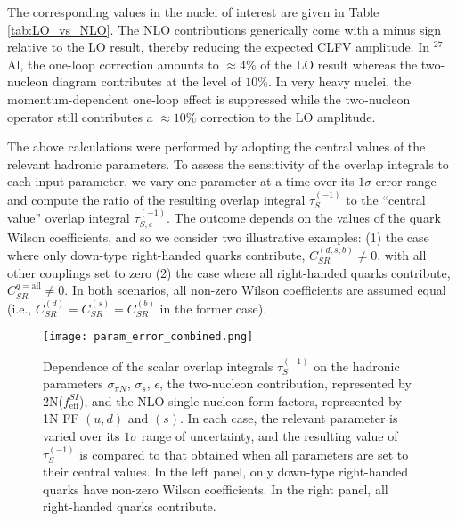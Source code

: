 \documentclass{book}[letterpaper,12pt]
\begin{document}
The corresponding values in the nuclei of interest are given in Table \ref{tab:LO_vs_NLO}. The NLO contributions generically come with a minus sign relative to the LO result, thereby reducing the expected CLFV amplitude. In $^{27}$Al, the one-loop correction amounts to $\approx 4\%$ of the LO result whereas the two-nucleon diagram contributes at the level of $10\%$. In very heavy nuclei, the momentum-dependent one-loop effect is suppressed while the two-nucleon operator still contributes a $\approx 10\%$ correction to the LO amplitude. 

The above calculations were performed by adopting the central values of the relevant hadronic parameters. To assess the sensitivity of the overlap integrals to each input parameter, we vary one parameter at a time over its $1\sigma$ error range and compute the ratio of the resulting overlap integral $\tau_S^{(-1)}$ to the ``central value'' overlap integral $\tau_{S,c}^{(-1)}$. The outcome depends on the values of the quark Wilson coefficients, and so we consider two illustrative examples: (1) the case where only down-type right-handed quarks contribute, $C_{SR}^{(d,s,b)}\neq 0$, with all other couplings set to zero (2) the case where all right-handed quarks contribute, $C_{SR}^{q=\mathrm{all}}\neq 0$. In both scenarios, all non-zero Wilson coefficients are assumed equal (i.e., $C^{(d)}_{SR}=C^{(s)}_{SR}=C^{(b)}_{SR}$ in the former case).
\begin{figure}
\centering
\texttt{[image: param\_error\_combined.png]}
\caption{Dependence of the scalar overlap integrals $\tau_S^{(-1)}$ on the hadronic parameters $\sigma_{\pi N}$, $\sigma_s$, $\epsilon$, the two-nucleon contribution, represented by 2N($f^{SI}_\mathrm{eff}$), and the NLO single-nucleon form factors, represented by 1N FF $(u,d)$ and $(s)$. In each case, the relevant parameter is varied over its $1\sigma$ range of uncertainty, and the resulting value of $\tau_S^{(-1)}$ is compared to that obtained when all parameters are set to their central values. In the left panel, only down-type right-handed quarks have non-zero Wilson coefficients. In the right panel, all right-handed quarks contribute.}
\label{fig:param_uncert}
\end{figure}
\end{document}
